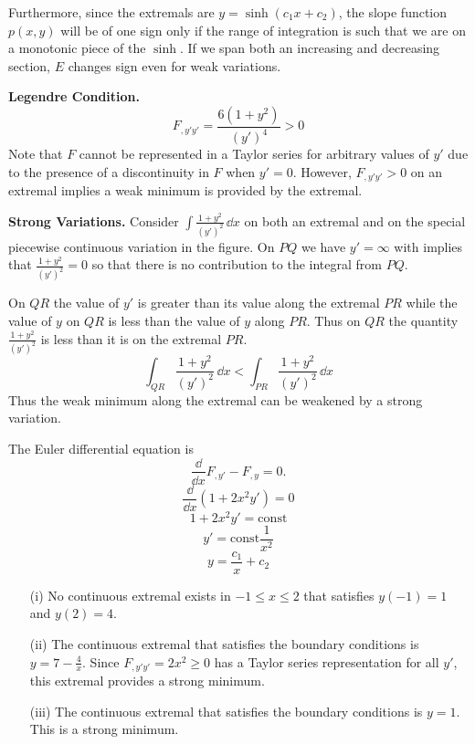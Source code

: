 \begin{Solution}
  Furthermore, since the extremals are $y = \sinh(c_1 x + c_2)$, the slope
  function $p(x,y)$ will be of one sign only if the range of integration
  is such that we are on a monotonic piece of the $\sinh$.  If 
  we span both an increasing and decreasing section, $E$ changes
  sign even for weak variations.





  \textbf{Legendre Condition.}
  \[
  F_{,y'y'} = \frac{ 6 (1 + y^2) }{ (y')^4 } > 0
  \]
  Note that $F$ cannot be represented in a Taylor series for arbitrary values
  of $y'$ due to the presence of a discontinuity in $F$ when $y' = 0$.
  However, $F_{,y'y'} > 0$ on an extremal implies a weak minimum is provided
  by the extremal.


  \textbf{Strong Variations.}
  Consider $\int \frac{ 1 + y^2 }{ (y')^2 } \,\dd x$ on both an extremal and on 
  the special piecewise continuous variation in the figure.  On $PQ$ we 
  have $y' = \infty$ with implies that $\frac{ 1 + y^2 }{ (y')^2 } = 0$
  so that there is no contribution to the integral from $PQ$.

  On $QR$ the value of $y'$ is greater than its value along the extremal 
  $PR$ while the value of $y$ on $QR$ is less than the value of $y$ along
  $PR$.  Thus on $QR$ the quantity $\frac{ 1 + y^2 }{ (y')^2 }$ is less 
  than it is on the extremal $PR$.
  \[
  \int_{QR} \frac{ 1 + y^2 }{ (y')^2 } \,\dd x <
  \int_{PR} \frac{ 1 + y^2 }{ (y')^2 } \,\dd x
  \]
  Thus the weak minimum along the extremal can be weakened by a strong 
  variation.
\end{Solution}



\begin{Solution}
  The Euler differential equation is
  \[
  \frac{\dd}{\dd x} F_{,y'} - F_{,y} = 0.
  \]
  \[
  \frac{\dd}{\dd x} (1 + 2 x^2 y') = 0
  \]
  \[
  1 + 2 x^2 y' = \mathrm{const}
  \]
  \[
  y' = \mathrm{const} \frac{1}{x^2}
  \]
  \[
  \boxed{
    y = \frac{c_1}{x} + c_2
    }
  \]
  \begin{itemize}
  \item[(i)]
    No continuous extremal exists in $-1 \leq x \leq 2$ that satisfies 
    $y(-1) = 1$ and $y(2) = 4$.
  \item[(ii)]
    The continuous extremal that satisfies the boundary conditions is 
    $y = 7 - \frac{4}{x}$. Since $F_{,y'y'} = 2 x^2 \geq 0$ has a Taylor series
    representation for all $y'$, this extremal provides a strong minimum.
  \item[(iii)]
    The continuous extremal that satisfies the boundary conditions is 
    $y = 1$.  This is a strong minimum.
  \end{itemize}
\end{Solution}



